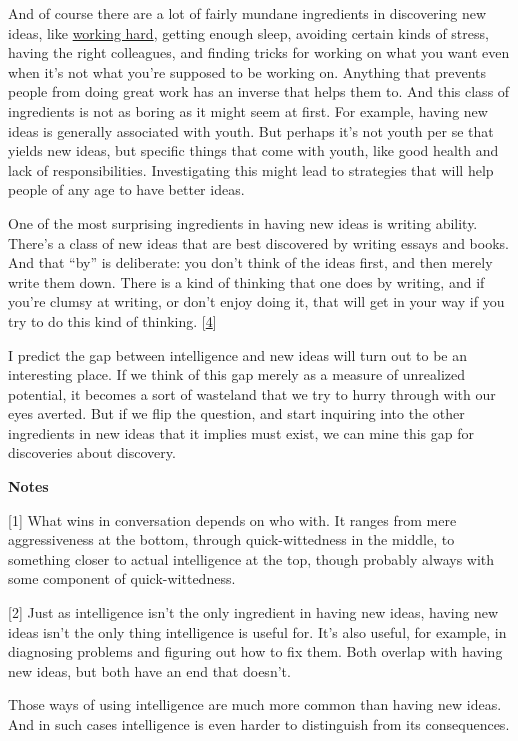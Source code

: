 And of course there are a lot of fairly mundane ingredients in
discovering new ideas, like \href{hwh.html}{working hard}, getting
enough sleep, avoiding certain kinds of stress, having the right
colleagues, and finding tricks for working on what you want even when
it's not what you're supposed to be working on. Anything that prevents
people from doing great work has an inverse that helps them to. And this
class of ingredients is not as boring as it might seem at first. For
example, having new ideas is generally associated with youth. But
perhaps it's not youth per se that yields new ideas, but specific things
that come with youth, like good health and lack of responsibilities.
Investigating this might lead to strategies that will help people of any
age to have better ideas.

One of the most surprising ingredients in having new ideas is writing
ability. There's a class of new ideas that are best discovered by
writing essays and books. And that ``by'' is deliberate: you don't think
of the ideas first, and then merely write them down. There is a kind of
thinking that one does by writing, and if you're clumsy at writing, or
don't enjoy doing it, that will get in your way if you try to do this
kind of thinking. {[}\hyperref[f4n]{4}{]}

I predict the gap between intelligence and new ideas will turn out to be
an interesting place. If we think of this gap merely as a measure of
unrealized potential, it becomes a sort of wasteland that we try to
hurry through with our eyes averted. But if we flip the question, and
start inquiring into the other ingredients in new ideas that it implies
must exist, we can mine this gap for discoveries about discovery.

\textbf{Notes}

{[}1{]} What wins in conversation depends on who with. It ranges from
mere aggressiveness at the bottom, through quick-wittedness in the
middle, to something closer to actual intelligence at the top, though
probably always with some component of quick-wittedness.

{[}2{]} Just as intelligence isn't the only ingredient in having new
ideas, having new ideas isn't the only thing intelligence is useful for.
It's also useful, for example, in diagnosing problems and figuring out
how to fix them. Both overlap with having new ideas, but both have an
end that doesn't.

Those ways of using intelligence are much more common than having new
ideas. And in such cases intelligence is even harder to distinguish from
its consequences.


